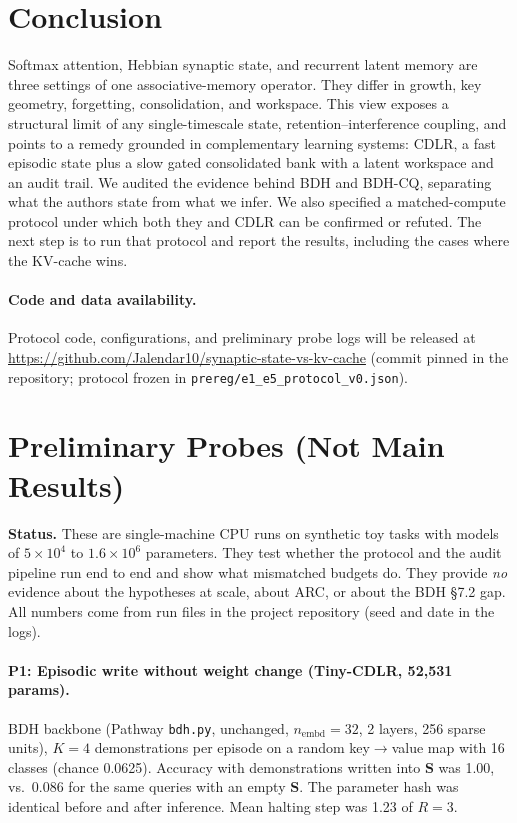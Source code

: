 \documentclass[11pt]{article}
\theoremstyle{remark}
\newcommand{\Sm}{\mathbf{S}}
\newcommand{\cdlr}{\textsc{CDLR}}
\begin{document}
\section{Conclusion}
\label{sec:conclusion}

Softmax attention, Hebbian synaptic state, and recurrent latent memory are three settings of one
associative-memory operator. They differ in growth, key geometry, forgetting, consolidation, and workspace. This
view exposes a structural limit of any single-timescale state, retention--interference coupling, and points to a
remedy grounded in complementary learning systems: \cdlr, a fast episodic state plus a slow gated consolidated bank
with a latent workspace and an audit trail. We audited the evidence behind BDH and BDH-CQ, separating what the
authors state from what we infer. We also specified a matched-compute protocol under which both they and \cdlr{}
can be confirmed or refuted. The next step is to run that protocol and report the results, including the cases
where the KV-cache wins.

\paragraph{Code and data availability.} Protocol code, configurations, and preliminary probe logs will be released
at \url{https://github.com/Jalendar10/synaptic-state-vs-kv-cache} (commit pinned in the repository; protocol frozen in \texttt{prereg/e1\_e5\_protocol\_v0.json}).




\appendix
\section{Preliminary Probes (Not Main Results)}
\label{app:probes}

\textbf{Status.} These are single-machine CPU runs on synthetic toy tasks with models of $5\times10^4$ to
$1.6\times10^6$ parameters. They test whether the protocol and the audit pipeline run end to end and show what
mismatched budgets do. They provide \emph{no} evidence about the hypotheses at scale, about ARC, or about the BDH
\S7.2 gap. All numbers come from run files in the project repository (seed and date in the logs).

\paragraph{P1: Episodic write without weight change (Tiny-\cdlr, 52,531 params).} BDH backbone (Pathway
\texttt{bdh.py}, unchanged, $n_{\text{embd}}{=}32$, 2 layers, 256 sparse units), $K{=}4$ demonstrations per episode
on a random key$\to$value map with 16 classes (chance 0.0625). Accuracy with demonstrations written into $\Sm$ was
1.00, vs.\ 0.086 for the same queries with an empty $\Sm$. The parameter hash was identical before and after
inference. Mean halting step was 1.23 of $R{=}3$.
\end{document}
